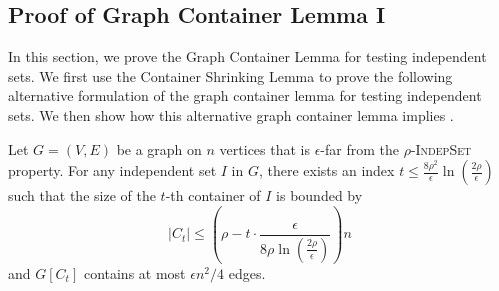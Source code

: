 \documentclass[11pt]{article}
\begin{document}
\subsection{Proof of Graph Container Lemma I}

In this section, we prove the Graph Container Lemma for testing independent sets.
We first use the Container Shrinking Lemma to prove the following alternative formulation of the graph container lemma for testing independent sets. 
We then show how this alternative graph container lemma implies .

\begin{lemma}
\label{lem:GCL-indepset} 
Let $G = (V,E)$ be a graph on $n$ vertices that is $\epsilon$-far from the \textsc{$\rho$-IndepSet} property. For any independent set $I$ in $G$, there exists an index $t \le \frac{8 \rho^2}{\epsilon}  \ln(\frac{2\rho}\epsilon)$ such that the size of the $t$-th container of $I$ is bounded by
\begin{equation}
\label{eq:GCL-indepset}
|C_t| \le \left( \rho - t \cdot \frac{\epsilon}{8 \rho \ln(\frac{2\rho}{\epsilon})} \right) n
\end{equation}
and $G[C_t]$ contains at most $\epsilon n^2/4$ edges.
\end{lemma}
\end{document}
